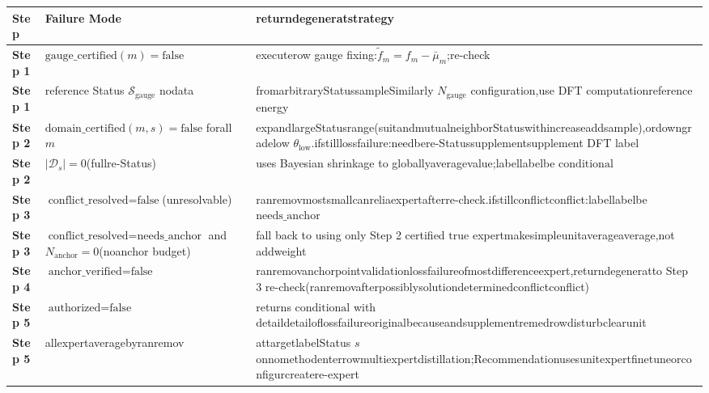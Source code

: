 \documentclass[
  12pt,
]{article}
\begin{document}
\begin{longtable}[]{@{}
  >{\raggedright\arraybackslash}p{}
  >{\raggedright\arraybackslash}p{}
  >{\raggedright\arraybackslash}p{}@{}}
\toprule\noalign{}
\begin{minipage}[b]{\linewidth}\raggedright
Step
\end{minipage} & \begin{minipage}[b]{\linewidth}\raggedright
Failure Mode
\end{minipage} & \begin{minipage}[b]{\linewidth}\raggedright
returndegeneratstrategy
\end{minipage} \\
\midrule\noalign{}
\endhead
\bottomrule\noalign{}
\endlastfoot
\textbf{Step 1} & \(\text{gauge\_certified}(m) = \text{false}\) & executerow
gauge fixing:\(\tilde{f}_m = f_m - \bar{\mu}_m\);re-check \\
\textbf{Step 1} & reference Status \(\mathcal{S}_{\text{gauge}}\) nodata &
fromarbitraryStatussampleSimilarly \(N_{\text{gauge}}\)  configuration,use DFT computationreference energy \\
\textbf{Step 2} & \(\text{domain\_certified}(m, s) = \text{false}\)
forall \(m\) & expandlargeStatusrange(suitandmutualneighborStatuswithincreaseaddsample),ordowngradelow
\(\theta_{\text{low}}\).ifstilllossfailure:needbere-Statussupplementsupplement DFT label  \\
\textbf{Step 2} & \(|\mathcal{D}_{s}| = 0\)(fullre-Status) & uses Bayesian
shrinkage to globallyaveragevalue;labellabelbe \(\text{conditional}\) \\
\textbf{Step 3} &
\(\text{conflict\_resolved} = \text{false}\)(unresolvable) &
ranremovmostsmallcanreliaexpertafterre-check.ifstillconflictconflict:labellabelbe \(\text{needs\_anchor}\) \\
\textbf{Step 3} & \(\text{conflict\_resolved} = \text{needs\_anchor}\)
and \(N_{\text{anchor}} = 0\)(noanchor budget) & fall back to using only Step 2 certified
\(\text{true}\) expertmakesimpleunitaverageaverage,not addweight \\
\textbf{Step 4} & \(\text{anchor\_verified} = \text{false}\) &
ranremovanchorpointvalidationlossfailureofmostdifferenceexpert,returndegeneratto  Step 3 re-check(ranremovafterpossiblysolutiondeterminedconflictconflict) \\
\textbf{Step 5} & \(\text{authorized} = \text{false}\) & returns
\(\text{conditional}\) with detaildetailoflossfailureoriginalbecauseandsupplementremedrowdisturbclearunit \\
\textbf{Step 5} & allexpertaveragebyranremov & attargetlabelStatus \(s\)
onnomethodenterrowmultiexpertdistillation;Recommendationusesunitexpertfinetuneorconfigurcreatere-expert \\
\end{longtable}
\end{document}
